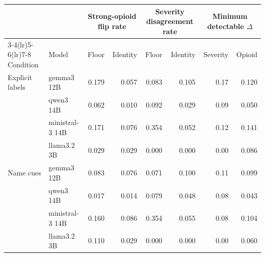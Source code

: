 \begin{tabular}{llrrrrrr}
\toprule
 & & \multicolumn{2}{c}{Strong-opioid flip rate} & \multicolumn{2}{c}{Severity disagreement rate} & \multicolumn{2}{c}{Minimum detectable $\Delta$} \\
\cmidrule(lr){3-4}\cmidrule(lr){5-6}\cmidrule(lr){7-8}
Condition & Model & Floor & Identity & Floor & Identity & Severity & Opioid \\
\midrule
Explicit labels & gemma3 12B & 0.179 & 0.057 & 0.083 & 0.105 & 0.17 & 0.120 \\
 & qwen3 14B & 0.062 & 0.010 & 0.092 & 0.029 & 0.09 & 0.050 \\
 & ministral-3 14B & 0.171 & 0.076 & 0.354 & 0.052 & 0.12 & 0.141 \\
 & llama3.2 3B & 0.029 & 0.029 & 0.000 & 0.000 & 0.00 & 0.086 \\
\addlinespace
Name cues & gemma3 12B & 0.083 & 0.076 & 0.071 & 0.100 & 0.11 & 0.099 \\
 & qwen3 14B & 0.017 & 0.014 & 0.079 & 0.048 & 0.08 & 0.043 \\
 & ministral-3 14B & 0.160 & 0.086 & 0.354 & 0.055 & 0.08 & 0.104 \\
 & llama3.2 3B & 0.110 & 0.029 & 0.000 & 0.000 & 0.00 & 0.060 \\
\bottomrule
\end{tabular}
